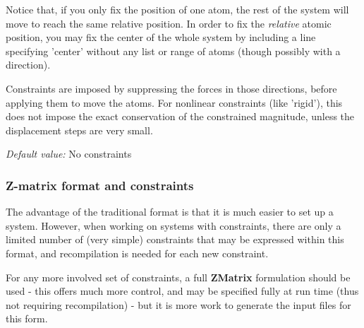 \documentclass[11pt]{article}
\begin{document}
\begin{description}
Notice that, if you only fix the position of one atom, the rest of the
system will move to reach the same relative position. In order to
fix the {\it relative} atomic position, you may fix the center of
the whole system by including a line specifying 'center'
without any list or range of atoms (though possibly with a direction).

Constraints are imposed by suppressing the forces in those directions,
before applying them to move the atoms. For nonlinear constraints
(like 'rigid'), this does not impose the exact conservation of the 
constrained magnitude, unless the displacement steps are very small.

{\it Default value:} No constraints

\end{description}

\subsubsection{Z-matrix format and constraints}

The advantage of the traditional format is that it is
much easier to set up a system. However, when working
on systems with constraints, there are only a limited
number of (very simple) constraints that may be expressed
within this format, and recompilation is needed for each
new constraint. 

For any more involved set of constraints, a 
full \textbf{ZMatrix} formulation should be used - this
offers much more control, and may be specified fully at
run time (thus not requiring recompilation) - but
it is more work to generate the input files for this form.
\end{document}
